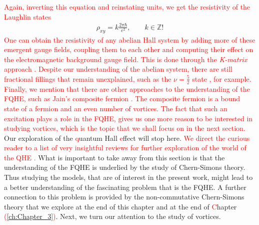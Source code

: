  \textcolor{red}{Again, inverting this equation and reinstating units, we get the resistivity of the Laughlin states}
\begin{align}
    \rho_{xy} =k\frac{2\pi \hbar}{e^2 }, \qquad k \in \mathbb{Z}!
\end{align}
 \textcolor{red}{One can obtain the resistivity of any abelian Hall system by adding more of these emergent gauge fields, coupling them to each other and computing their effect on the electromagnetic background gauge field. This is done through the \textit{K-matrix} approach \cite{PhysRevB.46.2290}. Despite our understanding of the abelian system, there are still fractional fillings that remain unexplained, such as the $\nu=\frac{5}{2}$ state \cite{Willett:1987zz}, for example. Finally, we mention that there are other approaches to the understanding of the FQHE, such as Jain's composite fermion \cite{PhysRevLett.63.199}. The composite fermion is a bound state of a fermion and an even number of vortices. The fact that such an excitation plays a role in the FQHE, gives us one more reason to be interested in studying vortices, which is the topic that we shall focus on in the next section.}\\
        \indent Our exploration of the \textcolor{red}{q}uantum Hall \textcolor{red}{e}ffect will stop here. \textcolor{red}{We direct the curious reader to a list of very insightful reviews for further exploration of the world of the QHE \cite{Wen:1995qn, Tong:2016kpv, Zee, yoshioka2002the, Girvin}.} What is important to take away from this section is that the understanding of the FQHE is underlied by the study of Chern-Simons theory. Thus studying the models, that are of interest in the present work, might lead to a better understanding of the fascinating problem that is the FQHE. A further connection to this problem is provided by the non-commutative Chern-Simons theory that we explore at the end of this chapter and at the end of \textcolor{red}{C}hapter \textcolor{red}{(\ref{ch:Chapter_3})}. Next, we turn our attention to the study of vortices.

